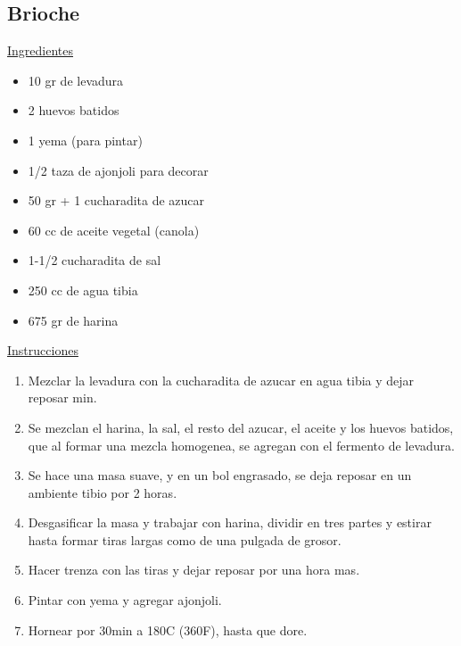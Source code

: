 \subsection{Brioche}

\underline{Ingredientes}

\begin{itemize}
\item 10 gr de levadura
\item 2 huevos batidos
\item 1 yema (para pintar)
\item 1/2 taza de ajonjoli para decorar
\item 50 gr + 1 cucharadita de azucar
\item 60 cc de aceite vegetal (canola)
\item 1-1/2 cucharadita de sal
\item 250 cc de agua tibia
\item 675 gr de harina
\end{itemize}

\underline{Instrucciones}

\begin{enumerate}
\item Mezclar la levadura con la cucharadita de azucar en agua tibia y dejar reposar  min.
\item Se mezclan el harina, la sal, el resto del azucar, el aceite y los huevos batidos, que al formar una mezcla homogenea, se agregan con el fermento de levadura.
\item Se hace una masa suave, y en un bol engrasado, se deja reposar en un ambiente tibio por 2 horas.
\item Desgasificar la masa y trabajar con harina, dividir en tres partes y estirar hasta formar tiras largas como de una pulgada de grosor.
\item Hacer trenza con las tiras y dejar reposar por una hora mas.
\item Pintar con yema y agregar ajonjoli.
\item Hornear por \Sim30min a 180C (360F), hasta que dore.
\end{enumerate}
